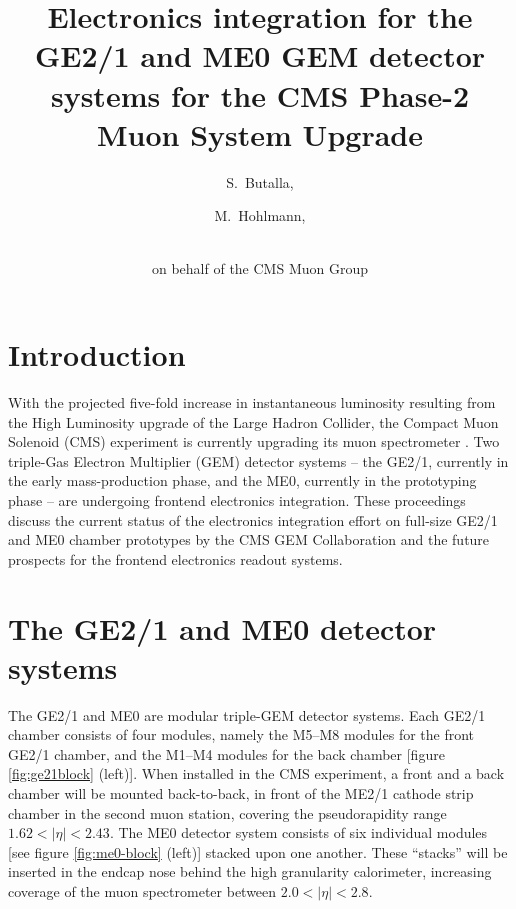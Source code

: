 \documentclass[a4paper,11pt]{article}
\title{Electronics integration for the GE2/1 and ME0 GEM detector systems for the CMS Phase-2 Muon System Upgrade}
\author[a,1]{S.~Butalla,\note{Corresponding author.}}
\author[a]{M.~Hohlmann,}
\author{\\on behalf of the CMS Muon Group}
\affiliation[a]{Florida Institute of Technology, Melbourne, FL, USA}
\begin{document}
\maketitle
\flushbottom

\section{Introduction}\label{sec:int}
With the projected five-fold increase in instantaneous luminosity resulting from the High Luminosity upgrade of the Large Hadron Collider, the Compact Muon Solenoid (CMS) experiment is currently upgrading its muon spectrometer \cite{MuonTDR}. Two triple-Gas Electron Multiplier (GEM) detector systems -- the GE2/1, currently in the early mass-production phase, and the ME0, currently in the prototyping phase -- are undergoing frontend electronics integration.
These proceedings discuss the current status of the electronics integration effort on full-size GE2/1 and ME0 chamber prototypes by the CMS GEM Collaboration and the future prospects for the frontend electronics readout systems.


\section{The GE2/1 and ME0 detector systems}
The GE2/1 and ME0 are modular triple-GEM detector systems. Each GE2/1 chamber consists of four modules, namely the M5--M8 modules for the front GE2/1 chamber, and the M1--M4 modules for the back chamber [figure \ref{fig:ge21block} (left)]. When installed in the CMS experiment, a front and a back chamber will be mounted back-to-back, in front of the ME2/1 cathode strip chamber in the second muon station, covering the pseudorapidity range $1.62 < |\eta| < 2.43$. The ME0 detector system consists of six individual modules [see figure \ref{fig:me0-block} (left)] stacked upon one another. These ``stacks'' will be inserted in the endcap nose behind the high granularity calorimeter, increasing coverage of the muon spectrometer between $2.0 < |\eta| < 2.8$.
\end{document}
